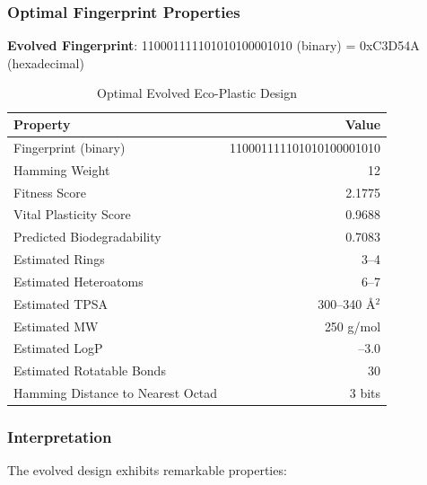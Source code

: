 \documentclass[11pt,letterpaper]{article}
\begin{document}
\subsubsection{Optimal Fingerprint Properties}

\textbf{Evolved Fingerprint}: 110001111101010100001010 (binary) = 0xC3D54A (hexadecimal)

\begin{table}[H]
\centering
\caption{Optimal Evolved Eco-Plastic Design}
\begin{tabular}{lr}
\toprule
\textbf{Property} & \textbf{Value} \\
\midrule
Fingerprint (binary) & 110001111101010100001010 \\
Hamming Weight & 12 \\
Fitness Score & 2.1775 \\
Vital Plasticity Score & 0.9688 \\
Predicted Biodegradability & 0.7083 \\
Estimated Rings & 3--4 \\
Estimated Heteroatoms & 6--7 \\
Estimated TPSA & 300--340 \AA$^2$ \\
Estimated MW & 250 g/mol \\
Estimated LogP & --3.0 \\
Estimated Rotatable Bonds & 30 \\
Hamming Distance to Nearest Octad & 3 bits \\
\bottomrule
\end{tabular}
\end{table}

\subsubsection{Interpretation}

The evolved design exhibits remarkable properties:
\end{document}

